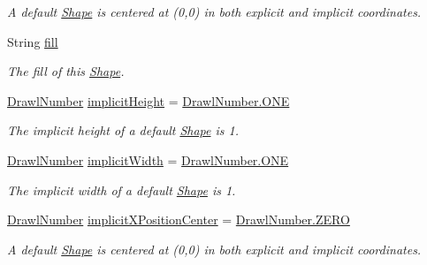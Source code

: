 \begin{DoxyCompactItemize}
\begin{DoxyCompactList}\small\item\em A default \hyperlink{classcom_1_1aarrelaakso_1_1drawl_1_1_shape}{Shape} is centered at (0,0) in both explicit and implicit coordinates. \end{DoxyCompactList}\item 
String \hyperlink{classcom_1_1aarrelaakso_1_1drawl_1_1_shape_ade398fbc41c7814eebb5b4c7a62861f6}{fill}
\begin{DoxyCompactList}\small\item\em The fill of this \hyperlink{classcom_1_1aarrelaakso_1_1drawl_1_1_shape}{Shape}. \end{DoxyCompactList}\item 
\hyperlink{classcom_1_1aarrelaakso_1_1drawl_1_1_drawl_number}{Drawl\+Number} \hyperlink{classcom_1_1aarrelaakso_1_1drawl_1_1_shape_af2f5b1d81ce2cdabc8b18dfb029f413b}{implicit\+Height} = \hyperlink{classcom_1_1aarrelaakso_1_1drawl_1_1_drawl_number_a0cd06e1d6344869ed300bc99afcde20a}{Drawl\+Number.\+O\+NE}
\begin{DoxyCompactList}\small\item\em The implicit height of a default \hyperlink{classcom_1_1aarrelaakso_1_1drawl_1_1_shape}{Shape} is 1. \end{DoxyCompactList}\item 
\hyperlink{classcom_1_1aarrelaakso_1_1drawl_1_1_drawl_number}{Drawl\+Number} \hyperlink{classcom_1_1aarrelaakso_1_1drawl_1_1_shape_a00c6b870d70449a79a000a3374ae041c}{implicit\+Width} = \hyperlink{classcom_1_1aarrelaakso_1_1drawl_1_1_drawl_number_a0cd06e1d6344869ed300bc99afcde20a}{Drawl\+Number.\+O\+NE}
\begin{DoxyCompactList}\small\item\em The implicit width of a default \hyperlink{classcom_1_1aarrelaakso_1_1drawl_1_1_shape}{Shape} is 1. \end{DoxyCompactList}\item 
\hyperlink{classcom_1_1aarrelaakso_1_1drawl_1_1_drawl_number}{Drawl\+Number} \hyperlink{classcom_1_1aarrelaakso_1_1drawl_1_1_shape_aa81b1d70b8974560f2c54b09809edcec}{implicit\+X\+Position\+Center} = \hyperlink{classcom_1_1aarrelaakso_1_1drawl_1_1_drawl_number_a14c9ceff1fb3f2bd5c3b380183db933a}{Drawl\+Number.\+Z\+E\+RO}
\begin{DoxyCompactList}\small\item\em A default \hyperlink{classcom_1_1aarrelaakso_1_1drawl_1_1_shape}{Shape} is centered at (0,0) in both explicit and implicit coordinates. \end{DoxyCompactList}\item 

\end{DoxyCompactItemize}
